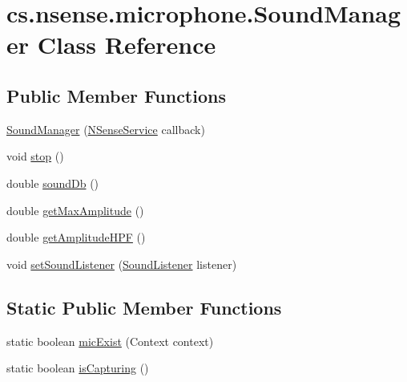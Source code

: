 \hypertarget{classcs_1_1nsense_1_1microphone_1_1_sound_manager}{\section{cs.\-nsense.\-microphone.\-Sound\-Manager Class Reference}
\label{classcs_1_1nsense_1_1microphone_1_1_sound_manager}
}
\subsection*{Public Member Functions}
\begin{DoxyCompactItemize}
\item 
\hyperlink{classcs_1_1nsense_1_1microphone_1_1_sound_manager_a56bb7700dae6ceb6b91e6cd208a41fb4}{Sound\-Manager} (\hyperlink{classcs_1_1nsense_1_1_n_sense_service}{N\-Sense\-Service} callback)
\item 
void \hyperlink{classcs_1_1nsense_1_1microphone_1_1_sound_manager_a1a3e9716b4b44d65e17fadc282734ca2}{stop} ()
\item 
double \hyperlink{classcs_1_1nsense_1_1microphone_1_1_sound_manager_a6de92701ea3e515a3dfaadea746983f1}{sound\-Db} ()
\item 
double \hyperlink{classcs_1_1nsense_1_1microphone_1_1_sound_manager_a4e7e5a7dcdc277fc5313dfbebf181e8d}{get\-Max\-Amplitude} ()
\item 
double \hyperlink{classcs_1_1nsense_1_1microphone_1_1_sound_manager_ac96127c1fc74ef91b984a791f4e74e2c}{get\-Amplitude\-H\-P\-F} ()
\item 
void \hyperlink{classcs_1_1nsense_1_1microphone_1_1_sound_manager_a136472b7e4cf4f493d4657806ac89652}{set\-Sound\-Listener} (\hyperlink{interfacecs_1_1nsense_1_1microphone_1_1_sound_listener}{Sound\-Listener} listener)
\end{DoxyCompactItemize}
\subsection*{Static Public Member Functions}
\begin{DoxyCompactItemize}
\item 
static boolean \hyperlink{classcs_1_1nsense_1_1microphone_1_1_sound_manager_a550eb642358cd55cb40b6f2ba72f6d17}{mic\-Exist} (Context context)
\item 
static boolean \hyperlink{classcs_1_1nsense_1_1microphone_1_1_sound_manager_aee12cd12c2afc09f0cdfffcac0b5d2fd}{is\-Capturing} ()
\end{DoxyCompactItemize}
